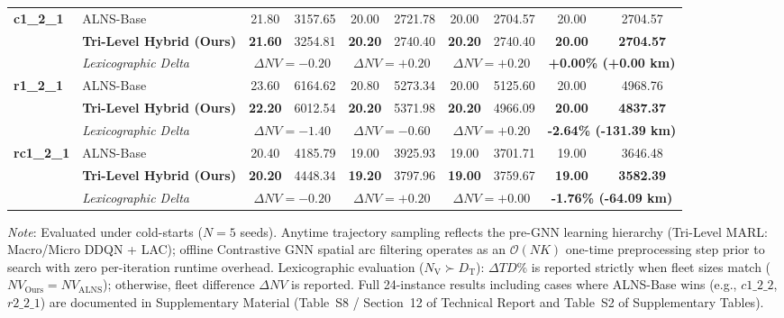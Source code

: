 \documentclass{ieeeaccess}
\newcommand{\NV}{{N_\mathrm{V}}}
\newcommand{\TD}{{D_\mathrm{T}}}
\begin{document}
\begin{table}[!t]
\begin{tabular*}{\textwidth}{@{\extracolsep{\fill}} ll cccccc cc @{}}
\midrule
\multirow{3}{*}{\textbf{c1\_2\_1}} & ALNS-Base & 21.80 & 3157.65 & 20.00 & 2721.78 & 20.00 & 2704.57 & 20.00 & 2704.57 \\
 & \textbf{Tri-Level Hybrid (Ours)} & \textbf{21.60} & 3254.81 & \textbf{20.20} & 2740.40 & \textbf{20.20} & 2740.40 & \textbf{20.00} & \textbf{2704.57} \\
 & \textit{Lexicographic Delta} & \multicolumn{2}{c}{$\Delta NV = -0.20$} & \multicolumn{2}{c}{$\Delta NV = +0.20$} & \multicolumn{2}{c}{$\Delta NV = +0.20$} & \multicolumn{2}{c}{\textbf{+0.00\% (+0.00 km)}} \\
\midrule
\multirow{3}{*}{\textbf{r1\_2\_1}} & ALNS-Base & 23.60 & 6164.62 & 20.80 & 5273.34 & 20.00 & 5125.60 & 20.00 & 4968.76 \\
 & \textbf{Tri-Level Hybrid (Ours)} & \textbf{22.20} & 6012.54 & \textbf{20.20} & 5371.98 & \textbf{20.20} & 4966.09 & \textbf{20.00} & \textbf{4837.37} \\
 & \textit{Lexicographic Delta} & \multicolumn{2}{c}{$\Delta NV = -1.40$} & \multicolumn{2}{c}{$\Delta NV = -0.60$} & \multicolumn{2}{c}{$\Delta NV = +0.20$} & \multicolumn{2}{c}{\textbf{-2.64\% (-131.39 km)}} \\
\midrule
\multirow{3}{*}{\textbf{rc1\_2\_1}} & ALNS-Base & 20.40 & 4185.79 & 19.00 & 3925.93 & 19.00 & 3701.71 & 19.00 & 3646.48 \\
 & \textbf{Tri-Level Hybrid (Ours)} & \textbf{20.20} & 4448.34 & \textbf{19.20} & 3797.96 & \textbf{19.00} & 3759.67 & \textbf{19.00} & \textbf{3582.39} \\
 & \textit{Lexicographic Delta} & \multicolumn{2}{c}{$\Delta NV = -0.20$} & \multicolumn{2}{c}{$\Delta NV = +0.20$} & \multicolumn{2}{c}{$\Delta NV = +0.00$} & \multicolumn{2}{c}{\textbf{-1.76\% (-64.09 km)}} \\
\bottomrule
\end{tabular*}
{\raggedright \scriptsize 

\vspace{1mm}
\textit{Note}: Evaluated under cold-starts ($N=5$ seeds). Anytime trajectory sampling reflects the pre-GNN learning hierarchy (Tri-Level MARL: Macro/Micro DDQN + LAC); offline Contrastive GNN spatial arc filtering operates as an $\mathcal{O}(NK)$ one-time preprocessing step prior to search with zero per-iteration runtime overhead. Lexicographic evaluation ($\NV \succ \TD$): $\Delta TD\%$ is reported strictly when fleet sizes match ($NV_{\text{Ours}} = NV_{\text{ALNS}}$); otherwise, fleet difference $\Delta NV$ is reported. Full 24-instance results including cases where ALNS-Base wins (e.g., $c1\_2\_2$, $r2\_2\_1$) are documented in Supplementary Material (Table~S8 / Section~12 of Technical Report and Table~S2 of Supplementary Tables).\par}
\end{table}
\end{document}
